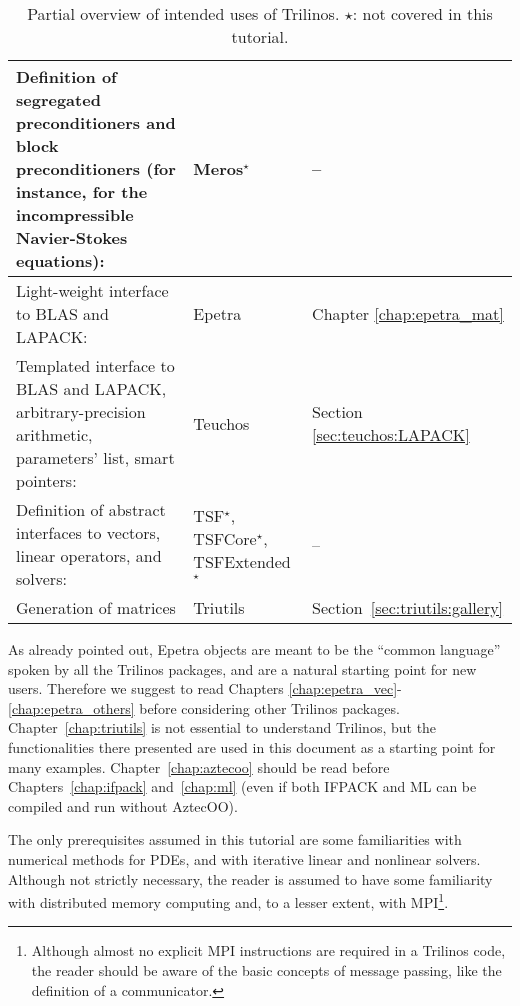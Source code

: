 \begin{table}[htbp]
\begin{tabular}{| p{8cm} | p{2.5cm} | p{3cm} |}
    Definition of segregated preconditioners and block preconditioners (for
    instance, for the incompressible Navier-Stokes equations):&
    Meros$^\star$ & -- \\
    \hline
    Light-weight interface to BLAS and LAPACK: & Epetra 
    & Chapter \ref{chap:epetra_mat} \\
    \hline
    Templated interface to BLAS and LAPACK, arbitrary-precision
    arithmetic, parameters' list, smart pointers:& Teuchos &
    Section \ref{sec:teuchos:LAPACK} \\
    \hline
    Definition of abstract interfaces to vectors, linear operators, and
    solvers:& TSF$^\star$, TSFCore$^\star$, TSFExtended$^\star$   & --
    \\
    \hline
    Generation of matrices & Triutils & Section~\ref{sec:triutils:gallery} \\
    \hline
  \end{tabular}
  \caption{Partial overview of intended uses of  Trilinos. $\star$:
    not covered in this tutorial.}
  \label{tab:tripackages}
\end{table}

\begin{remark}
  As already pointed out, Epetra objects are meant to be the ``common
  language'' spoken by all the Trilinos packages, and are a natural
  starting point for new users. Therefore we suggest to read Chapters
  \ref{chap:epetra_vec}-\ref{chap:epetra_others} before considering
  other Trilinos packages. Chapter~\ref{chap:triutils} is not essential
  to understand Trilinos, but the functionalities there presented are
  used in this document as a starting point for many examples.
  Chapter~\ref{chap:aztecoo} should be read before
  Chapters~\ref{chap:ifpack} and~\ref{chap:ml} (even if both IFPACK and
  ML can be compiled and run without AztecOO).
\end{remark}

The only prerequisites assumed in this tutorial are some familiarities
with numerical methods for PDEs, and with iterative linear and nonlinear
solvers. Although not strictly necessary, the reader is assumed to have
some familiarity with distributed memory computing and, to a lesser
extent, with MPI\footnote{Although almost no explicit MPI instructions
  are required in a Trilinos code, the reader should be aware of the
  basic concepts of message passing, like the definition of a
  communicator.}.

\smallskip

